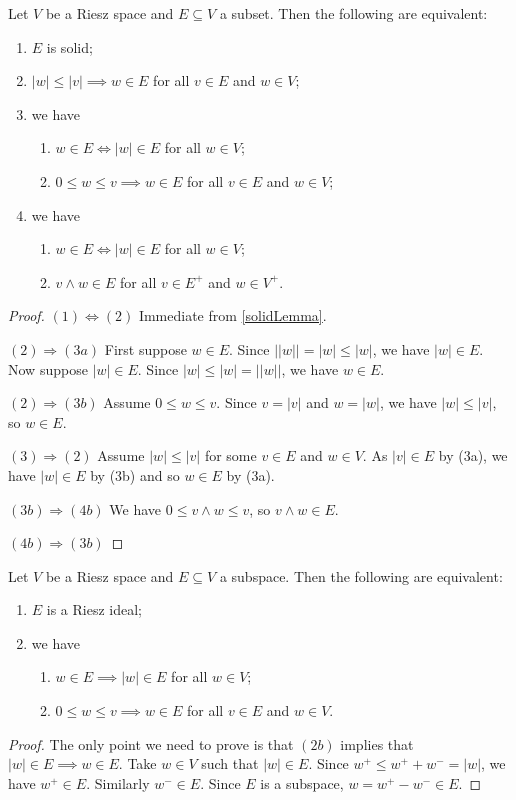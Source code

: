 \begin{proposition} \label{RieszSolidEquivalents}
Let $V$ be a Riesz space and $E\subseteq V$ a subset. Then the following are equivalent:
\begin{enumerate}
\item $E$ is solid;
\item $|w|\leq |v| \implies w\in E$ for all $v\in E$ and $w\in V$;
\item we have
\begin{enumerate}
\item $w \in E \iff |w|\in E$ for all $w\in V$;
\item $0\leq w \leq v \implies w\in E$ for all $v\in E$ and $w\in V$;
\end{enumerate}
\item we have
\begin{enumerate}
\item $w \in E \iff |w|\in E$ for all $w\in V$;
\item $v\wedge w\in E$ for all $v\in E^+$ and $w\in V^+$.
\end{enumerate}
\end{enumerate}
\end{proposition}
\begin{proof}
$(1) \Leftrightarrow (2)$ Immediate from \ref{solidLemma}.

$(2) \Rightarrow (3a)$ First suppose $w\in E$. Since $\big||w|\big| = |w|\leq |w|$, we have $|w|\in E$. Now suppose $|w|\in E$. Since $|w|\leq |w| = \big||w|\big|$, we have $w\in E$.

$(2) \Rightarrow (3b)$ Assume $0 \leq w \leq v$. Since $v = |v|$ and $w = |w|$, we have $|w|\leq |v|$, so $w\in E$.

$(3) \Rightarrow (2)$ Assume $|w| \leq |v|$ for some $v\in E$ and $w\in V$. As $|v|\in E$ by (3a), we have $|w|\in E$ by (3b) and so $w\in E$ by (3a).

$(3b) \Rightarrow (4b)$ We have $0\leq v\wedge w\leq v$, so $v\wedge w\in E$.

$(4b) \Rightarrow (3b)$ 
\end{proof}
\begin{corollary} \label{RieszIdealEquivalents}
Let $V$ be a Riesz space and $E\subseteq V$ a subspace. Then the following are equivalent:
\begin{enumerate}
\item $E$ is a Riesz ideal;
\item we have
\begin{enumerate}
\item $w \in E \implies |w|\in E$ for all $w\in V$;
\item $0\leq w \leq v \implies w\in E$ for all $v\in E$ and $w\in V$.
\end{enumerate}
\end{enumerate}
\end{corollary}
\begin{proof}
The only point we need to prove is that $(2b)$ implies that $|w|\in E \implies w\in E$. Take $w\in V$ such that $|w|\in E$. Since $w^+ \leq w^+ + w^- = |w|$, we have $w^+\in E$. Similarly $w^-\in E$. Since $E$ is a subspace, $w = w^+ - w^- \in E$.
\end{proof}

